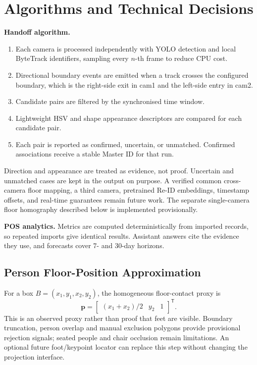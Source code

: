 \section{Algorithms and Technical Decisions}
\textbf{Handoff algorithm.}
\begin{enumerate}
\item Each camera is processed independently with YOLO detection and local ByteTrack identifiers, sampling every $n$-th frame to reduce CPU cost.
\item Directional boundary events are emitted when a track crosses the configured boundary, which is the right-side exit in cam1 and the left-side entry in cam2.
\item Candidate pairs are filtered by the synchronised time window.
\item Lightweight HSV and shape appearance descriptors are compared for each candidate pair.
\item Each pair is reported as confirmed, uncertain, or unmatched. Confirmed associations receive a stable Master ID for that run.
\end{enumerate}
Direction and appearance are treated as evidence, not proof. Uncertain and unmatched cases are kept in the output on purpose. A verified common cross-camera floor mapping, a third camera, pretrained Re-ID embeddings, timestamp offsets, and real-time guarantees remain future work. The separate single-camera floor homography described below is implemented provisionally.

\textbf{POS analytics.} Metrics are computed deterministically from imported records, so repeated imports give identical results. Assistant answers cite the evidence they use, and forecasts cover 7- and 30-day horizons.

\subsection{Person Floor-Position Approximation}
For a box $B=(x_1,y_1,x_2,y_2)$, the homogeneous floor-contact proxy is
\begin{equation}
\mathbf{p}=\begin{bmatrix}(x_1+x_2)/2 & y_2 & 1\end{bmatrix}^{\mathsf T}.
\label{eq:floor-foot}
\end{equation}
This is an observed proxy rather than proof that feet are visible. Boundary truncation, person overlap and manual exclusion polygons provide provisional rejection signals; seated people and chair occlusion remain limitations. An optional future foot/keypoint locator can replace this step without changing the projection interface.

